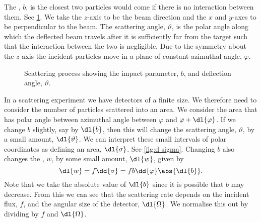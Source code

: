     The , \(b\), is the closest two particles would come if there is no interaction between them.
    See \cref{fig:scattering impact parameter}.
    We take the \(z\)-axis to be the beam direction and the \(x\) and \(y\)-axes to be perpendicular to the beam.
    The scattering angle, \(\vartheta\), is the polar angle along which the deflected beam travels after it is sufficiently far from the target such that the interaction between the two is negligible.
    Due to the symmetry about the \(z\) axis the incident particles move in a plane of constant azimuthal angle, \(\varphi\).
    
    \begin{figure}
        \caption{Scattering process showing the impact parameter, \(b\), and deflection angle, \(\vartheta\).}
        \label{fig:scattering impact parameter}
    \end{figure}
    
    In a scattering experiment we have detectors of a finite size.
    We therefore need to consider the number of particles scattered into an area.
    We consider the area that has polar angle between azimuthal angle between \(\varphi\) and \(\varphi + \dl{\varphi}\).
    If we change \(b\) slightly, say by \(\dl{b}\), then this will change the scattering angle, \(\vartheta\), by a small amount, \(\dl{\vartheta}\).
    We can interpret these small intervals of polar coordinates as defining an area, \(\dl{\sigma}\).
    See \cref{fig:d sigma}.
    Changing \(b\) also changes the , \(w\), by some small amount, \(\dl{w}\), given by
    \begin{equation}
        \dl{w} = f\dd{\sigma} = fb\dd{\varphi}\abs{\dl{b}}.
    \end{equation}
    Note that we take the absolute value of \(\dl{b}\) since it is possible that \(b\) may decrease.
    From this we can see that the scattering rate depends on the incident flux, \(f\), and the angular size of the detector, \(\dl{\Omega}\).
    We normalise this out by dividing by \(f\) and \(\dl{\Omega}\).
    
